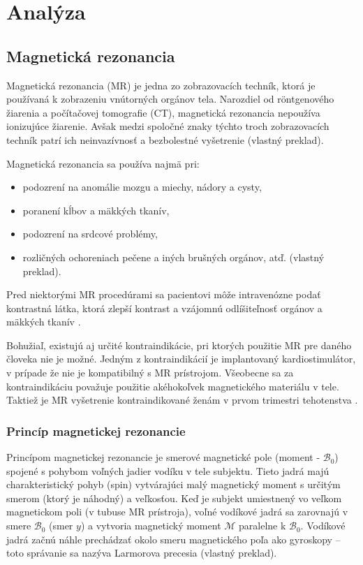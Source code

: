 \chapter {Analýza}

\section {Magnetická rezonancia}

Magnetická rezonancia (MR) je jedna zo zobrazovacích techník, ktorá je používaná k zobrazeniu vnútorných orgánov tela.
Narozdiel od röntgenového žiarenia a počítačovej tomografie (CT), magnetická rezonancia nepoužíva ionizujúce žiarenie. Avšak medzi spoločné znaky týchto troch zobrazovacích techník patrí ich neinvazívnosť a bezbolestné vyšetrenie \cite{basic_principles_of_mri} (vlastný preklad). \newline

Magnetická rezonancia sa používa najmä pri:
\begin {itemize}
\item {podozrení na anomálie mozgu a miechy, nádory a cysty,}
\item {poranení kĺbov a mäkkých tkanív,}
\item {podozrení na srdcové problémy,}
\item {rozličných ochoreniach pečene a iných brušných orgánov, atď. \cite{mr_usage} (vlastný preklad).}
\end {itemize}

Pred niektorými MR procedúrami sa pacientovi môže intravenózne podať kontrastná látka, ktorá zlepší kontrast a vzájomnú odlíšiteľnosť orgánov a mäkkých tkanív \cite{contrast_agents}.

Bohužiaľ, existujú aj určité kontraindikácie, pri ktorých použitie MR pre daného človeka nie je možné.
Jedným z kontraindikácií je implantovaný kardiostimulátor, v prípade že nie je kompatibilný s MR prístrojom. Všeobecne sa za kontraindikáciu považuje použitie akéhokoľvek magnetického materiálu v tele. Taktiež je MR vyšetrenie kontraindikované ženám v prvom trimestri tehotenstva \cite{mr_contraindications}.

\subsection {Princíp magnetickej rezonancie}

Princípom magnetickej rezonancie je smerové magnetické pole (moment - $\mathcal{B}_{0}$) spojené s pohybom voľných jadier vodíku v tele subjektu. Tieto jadrá majú charakteristický pohyb (spin) vytvárajúci malý magnetický moment s určitým smerom (ktorý je náhodný) a veľkosťou. Keď je subjekt umiestnený vo veľkom magnetickom poli (v tubuse MR prístroja), voľné vodíkové jadrá sa zarovnajú v smere $\mathcal{B}_{0}$ (smer $y$) a vytvoria magnetický moment $\mathcal{M}$ paralelne k $\mathcal{B}_{0}$. Vodíkové jadrá začnú náhle prechádzať okolo smeru magnetického poľa ako gyroskopy -- toto správanie sa nazýva Larmorova precesia \cite{basic_principles_of_mri} (vlastný preklad).

